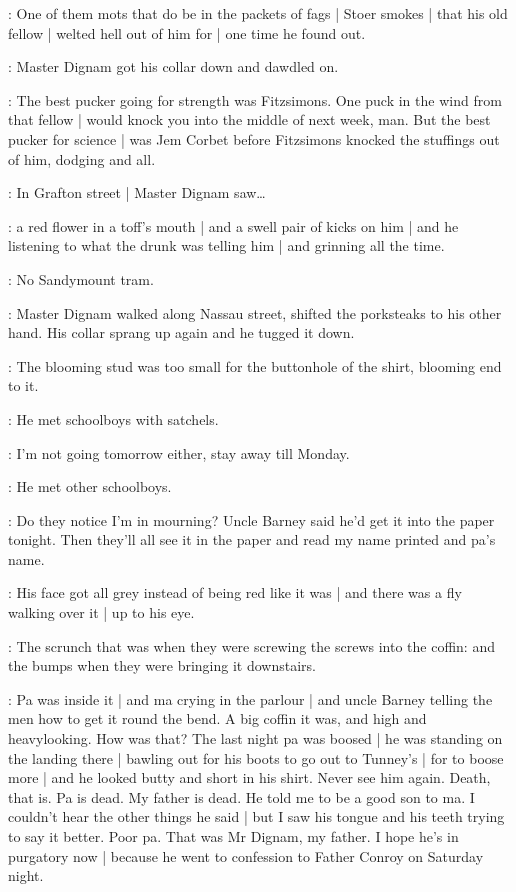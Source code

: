 \masterdignam:
One of them mots that do be in the packets of fags |
Stoer smokes |
that his old fellow |
welted hell out of him for |
one time he found out.

:
Master Dignam got his collar down and dawdled on.

\masterdignam:
The best pucker
going for strength was Fitzsimons.
One puck in the wind from that fellow |
would knock you into the middle of next week, man.
But the best pucker for science |
was Jem Corbet
before Fitzsimons knocked the stuffings out of him,
dodging and all.

:
In Grafton street |
Master Dignam saw\ldots

\masterdignam:
a red flower in a toff's mouth |
and a swell pair of kicks on him |
and he listening to what the drunk was telling him |
and grinning all the time.

\masterdignam:
No Sandymount tram.

:
Master Dignam walked along Nassau street,
shifted the porksteaks to his other hand.
His collar sprang up again and he tugged it down.

\masterdignam:
The blooming stud was too small
for the buttonhole of the shirt,
blooming end to it.

:
He met schoolboys with satchels.

\masterdignam:
I'm not going tomorrow either,
stay away till Monday.

:
He met other schoolboys.

\masterdignam:
Do they notice I'm in mourning?
Uncle Barney said he'd get it into the paper tonight.
Then they'll all see it in the paper
and read my name printed and pa's name.

:
His face got all grey
instead of being red like it was |
and there was a fly walking over it |
up to his eye.

\masterdignam:
The scrunch that was
when they were screwing the screws into the coffin:
and the bumps when they were bringing it downstairs.

\masterdignam:
Pa was inside it |
and ma crying in the parlour |
and uncle Barney telling the men
how to get it round the bend.
A big coffin it was,
and high and heavylooking.
How was that?
The last night pa was boosed |
he was standing on the landing there |
bawling out for his boots to go out to Tunney's |
for to boose more |
and he looked butty and short in his shirt.
Never see him again.
Death, that is.
Pa is dead.
My father is dead.
He told me to be a good son to ma.
I couldn't hear the other things he said |
but I saw his tongue and his teeth trying to say it better.
Poor pa.
That was Mr Dignam, my father.
I hope he's in purgatory now |
because he went to confession to Father Conroy on Saturday night.


